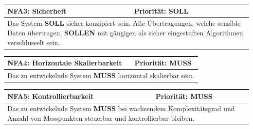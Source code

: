 \documentclass[titlepage]{report}
\begin{document}
\begin{center}
\begin{tabular}{p{}>{\raggedleft\arraybackslash}p{}}\toprule
    \textbf{NFA3: Sicherheit} & \textbf{Priorität: SOLL} \\\midrule
	\multicolumn{2}{p{\textwidth-\tabcolsep}}{%
        Das System \textbf{SOLL} sicher konzipiert sein.
        Alle Übertragungen, welche sensible Daten übertragen,  \textbf{SOLLEN} mit gängigen
        als sicher eingestuften Algorithmen verschlüsselt sein.
        }\\\bottomrule
\end{tabular}
    \label{table:NFA3}
\end{center}
\begin{center}
\begin{tabular}{p{}>{\raggedleft\arraybackslash}p{}}\toprule
    \textbf{NFA4: Horizontale Skalierbarkeit} & \textbf{Priorität: MUSS} \\\midrule
	\multicolumn{2}{p{\textwidth-\tabcolsep}}{%
        Das zu entwickelnde System \textbf{MUSS} horizontal skalierbar
        sein.
        }\\\bottomrule
\end{tabular}
    \label{table:NFA4}
\end{center}
\begin{center}
\begin{tabular}{p{}>{\raggedleft\arraybackslash}p{}}\toprule
    \textbf{NFA5: Kontrollierbarkeit} & \textbf{Priorität: MUSS} \\\midrule
	\multicolumn{2}{p{\textwidth-\tabcolsep}}{%
        Das zu entwickelnde System \textbf{MUSS} bei wachsendem
        Komplexitätsgrad und Anzahl von Messpunkten steuerbar und
        kontrollierbar bleiben.
        }\\\bottomrule
\end{tabular}
    \label{table:NFA5}
\end{center}
\end{document}
